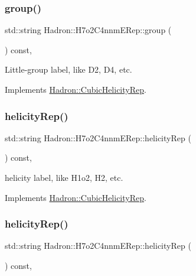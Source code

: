 \subsubsection{\texorpdfstring{group()}{group()}\hspace{0.1cm}{\footnotesize\ttfamily [2/2]}}
{\footnotesize\ttfamily std\+::string Hadron\+::\+H7o2\+C4nnm\+E\+Rep\+::group (\begin{DoxyParamCaption}{ }\end{DoxyParamCaption}) const\hspace{0.3cm}{\ttfamily [inline]}, {\ttfamily [virtual]}}

Little-\/group label, like D2, D4, etc. 

Implements \mbox{\hyperlink{structHadron_1_1CubicHelicityRep_a101a7d76cd8ccdad0f272db44b766113}{Hadron\+::\+Cubic\+Helicity\+Rep}}.

\mbox{\label{structHadron_1_1H7o2C4nnmERep_ab9cdc1b5f216f5ac06995e9405037509}} 
\subsubsection{\texorpdfstring{helicityRep()}{helicityRep()}\hspace{0.1cm}{\footnotesize\ttfamily [1/2]}}
{\footnotesize\ttfamily std\+::string Hadron\+::\+H7o2\+C4nnm\+E\+Rep\+::helicity\+Rep (\begin{DoxyParamCaption}{ }\end{DoxyParamCaption}) const\hspace{0.3cm}{\ttfamily [inline]}, {\ttfamily [virtual]}}

helicity label, like H1o2, H2, etc. 

Implements \mbox{\hyperlink{structHadron_1_1CubicHelicityRep_af1096946b7470edf0a55451cc662f231}{Hadron\+::\+Cubic\+Helicity\+Rep}}.

\mbox{\label{structHadron_1_1H7o2C4nnmERep_ab9cdc1b5f216f5ac06995e9405037509}} 
\subsubsection{\texorpdfstring{helicityRep()}{helicityRep()}\hspace{0.1cm}{\footnotesize\ttfamily [2/2]}}
{\footnotesize\ttfamily std\+::string Hadron\+::\+H7o2\+C4nnm\+E\+Rep\+::helicity\+Rep (\begin{DoxyParamCaption}{ }\end{DoxyParamCaption}) const\hspace{0.3cm}{\ttfamily [inline]}, {\ttfamily [virtual]}}

